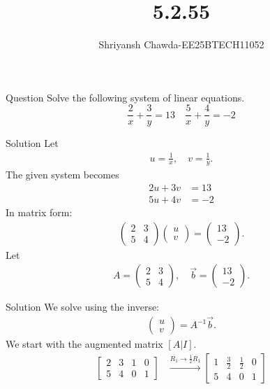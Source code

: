 \documentclass{beamer}
\newcommand{\myvec}[1]{\ensuremath{\begin{pmatrix}#1\end{pmatrix}}}
\begin{document}
\title{5.2.55}
\author{Shriyansh Chawda-EE25BTECH11052}
\frame{\titlepage}
\begin{frame}{Question}
Solve the following system of linear equations.\[
\frac{2}{x} + \frac{3}{y} = 13 \quad \frac{5}{x} + \frac{4}{y} = -2 \]
\end{frame}

\begin{frame}{Solution} 
Let 
\begin{align}
	u = \frac{1}{x}, \quad v = \frac{1}{y}.
\end{align}
The given system becomes
\begin{align}
	2u + 3v &= 13 \\
	5u + 4v &= -2
\end{align}
In matrix form:
\begin{align}
	\myvec{2 & 3 \\ 5 & 4} \myvec{u \\ v} = \myvec{13 \\ -2}.
\end{align}
Let 
\begin{align}
	A = \myvec{2 & 3 \\ 5 & 4}, \quad \vec{b} = \myvec{13 \\ -2}.
\end{align}
\end{frame}
	
\begin{frame}{Solution}
	We solve using the inverse:
\begin{align}
	\myvec{u \\ v} = A^{-1}\vec{b}.
\end{align}
We start with the augmented matrix $[A|I]$.
\begin{align}
	\left[\begin{array}{cc|cc}
		2 & 3 & 1 & 0 \\
		5 & 4 & 0 & 1
	\end{array}\right]
	&\xrightarrow{R_1 \rightarrow \frac{1}{2}R_1}
	\left[\begin{array}{cc|cc}
		1 & \frac{3}{2} & \frac{1}{2} & 0 \\
		5 & 4 & 0 & 1
	\end{array}\right] 
\end{align}
\end{frame}
\end{document}
